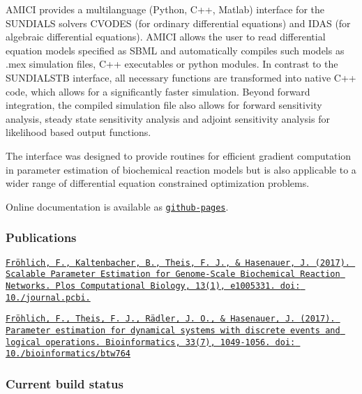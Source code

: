 A\+M\+I\+CI provides a multilanguage (Python, C++, Matlab) interface for the S\+U\+N\+D\+I\+A\+LS solvers C\+V\+O\+D\+ES (for ordinary differential equations) and I\+D\+AS (for algebraic differential equations). A\+M\+I\+CI allows the user to read differential equation models specified as S\+B\+ML and automatically compiles such models as .mex simulation files, C++ executables or python modules. In contrast to the S\+U\+N\+D\+I\+A\+L\+S\+TB interface, all necessary functions are transformed into native C++ code, which allows for a significantly faster simulation. Beyond forward integration, the compiled simulation file also allows for forward sensitivity analysis, steady state sensitivity analysis and adjoint sensitivity analysis for likelihood based output functions.

The interface was designed to provide routines for efficient gradient computation in parameter estimation of biochemical reaction models but is also applicable to a wider range of differential equation constrained optimization problems.

Online documentation is available as \href{http://icb-dcm.github.io/AMICI/}{\tt github-\/pages}.

\subsubsection*{Publications}

\href{https://doi.org/10.1371/journal.pcbi.1005331}{\tt Fröhlich, F., Kaltenbacher, B., Theis, F. J., \& Hasenauer, J. (2017). Scalable Parameter Estimation for Genome-\/\+Scale Biochemical Reaction Networks. Plos Computational Biology, 13(1), e1005331. doi\+: 10./journal.pcbi.}

\href{https://doi.org/10.1093/bioinformatics/btw764}{\tt Fröhlich, F., Theis, F. J., Rädler, J. O., \& Hasenauer, J. (2017). Parameter estimation for dynamical systems with discrete events and logical operations. Bioinformatics, 33(7), 1049-\/1056. doi\+: 10./bioinformatics/btw764}

\subsubsection*{Current build status}

\href{https://travis-ci.org/ICB-DCM/AMICI}{\tt } \href{https://codecov.io/gh/ICB-DCM/AMICI}{\tt } \href{https://www.codacy.com/app/FFroehlich/AMICI?utm_source=github.com&amp;utm_medium=referral&amp;utm_content=ICB-DCM/AMICI&amp;utm_campaign=Badge_Grade}{\tt } 